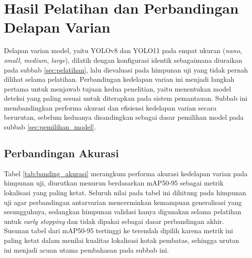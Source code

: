 \section{Hasil Pelatihan dan Perbandingan Delapan Varian}
\label{sec:hasil_banding}

Delapan varian model, yaitu YOLOv8 dan YOLO11 pada empat ukuran (\textit{nano}, 
\textit{small}, \textit{medium}, \textit{large}), dilatih dengan konfigurasi identik 
sebagaimana diuraikan pada subbab \ref{sec:pelatihan}, lalu dievaluasi pada himpunan uji 
yang tidak pernah dilihat selama pelatihan. Perbandingan kedelapan varian ini menjadi 
langkah pertama untuk menjawab tujuan kedua penelitian, yaitu menentukan model deteksi yang 
paling sesuai untuk diterapkan pada sistem pemantauan. Subbab ini membandingkan performa 
akurasi dan efisiensi kedelapan varian secara berurutan, sebelum keduanya disandingkan 
sebagai dasar pemilihan model pada subbab \ref{sec:pemilihan_model}.

\subsection{Perbandingan Akurasi}
\label{sec:perbandingan_akurasi}

Tabel \ref{tab:banding_akurasi} merangkum performa akurasi kedelapan varian pada himpunan 
uji, diurutkan menurun berdasarkan mAP50-95 sebagai metrik lokalisasi yang paling ketat. 
Seluruh nilai pada tabel ini dihitung pada himpunan uji agar perbandingan antarvarian 
mencerminkan kemampuan generalisasi yang sesungguhnya, sedangkan himpunan validasi hanya 
digunakan selama pelatihan untuk \textit{early stopping} dan tidak dipakai sebagai dasar 
perbandingan akhir. Susunan tabel dari mAP50-95 tertinggi ke terendah dipilih karena metrik 
ini paling ketat dalam menilai kualitas lokalisasi kotak pembatas, sehingga urutan ini 
menjadi acuan utama pembahasan pada subbab ini.

